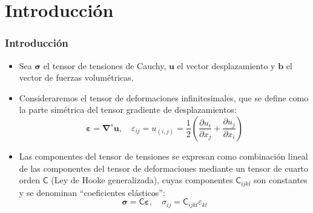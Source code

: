 \documentclass[10pt, aspectratio=43]{beamer}
\begin{document}
\section[Intro]{Introducción}
\begin{frame}
\frametitle{Introducción}
\begin{itemize}
\item Sea $\bm{\sigma}$ el tensor de tensiones
de Cauchy, $\bm{u}$ el vector desplazamiento y $\bm{b}$ el vector de
fuerzas volumétricas.
\item Consideraremos el tensor de deformaciones infinitesimales, que se define
como la parte simétrica del tensor gradiente de desplazamientos:
\begin{equation}
\bm{\varepsilon}=\bm{\nabla}^s \bm{u}, \quad
\varepsilon_{ij}=u_{(i,j)}=\frac{1}{2}\left(
\frac{\partial u_i}{\partial x_j}+
\frac{\partial u_j}{\partial x_i}
\right)
\end{equation}
\item Las componentes del tensor de
tensiones se expresan como combinación lineal de las componentes del tensor
de deformaciones mediante un tensor de cuarto orden
$\boldsymbol{\mathsf{C}}$ (Ley de Hooke generalizada), cuyas
componentes $\mathsf{C}_{ijkl}$
son constantes y se denominan ``coeficientes elásticos'':
\begin{equation}
\bm{\sigma}= \boldsymbol{\mathsf{C}} \bm{\varepsilon} , \quad
\sigma_{ij}=\mathsf{C}_{ijkl} \varepsilon_{kl} \label{hookegen}
\end{equation}
\end{itemize}
\end{frame}
\end{document}
